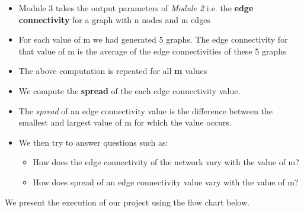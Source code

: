 \documentclass[12pt,letterpaper,titlepage,en-US]{article}
\begin{document}
\begin{itemize}
\begin{itemize}
\item Module 3 takes the output parameters of \textit{Module 2} i.e. the \textbf{edge connectivity} for a graph with n nodes and m edges

\item For each value of m we had generated 5 graphs. The edge connectivity for that value of m is the average of the edge connectivities of these 5 graphs
 \item The above computation is repeated for all \textbf{m} values

\item We compute the \textbf{spread} of the each edge connectivity value. 

\item The \textit{spread} of an edge connectivity value is the difference between the smallest and largest value of m for which the value occurs.
 

 
\item We then try to answer questions such as:
\begin{itemize}
\item How does the edge connectivity of the network vary with the value of m?
\item How does spread of an edge connectivity value vary with the value of m? 
\end{itemize}


\end{itemize}

We present the execution of our project using the flow chart below.\\


\end{itemize}
\end{document}
